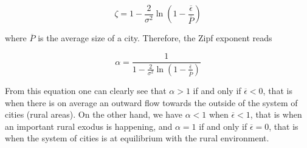 \begin{equation}
    \zeta = 1 - \frac{2}{\sigma^2} \ln\left(1 -
    \frac{\overline{\epsilon}}{\overline{P}}\right)
\end{equation}

where $\overline{P}$ is the average size of a city. Therefore, the Zipf exponent
reads

\begin{equation}
    \boxed{    \alpha = \frac{1}{1 - \frac{2}{\sigma^2} \ln\left(1 -
\frac{\overline{\epsilon}}{\overline{P}}\right)}}
\end{equation}

From this equation one can clearly see that $\alpha > 1$ if and only if
$\overline{\epsilon} < 0$, that is when there is on average an outward flow
towards the outside of the system of cities (rural areas). On the other hand, we
have $\alpha < 1$ when $\overline{\epsilon} < 1$, that is when an important
rural exodus is happening, and $\alpha = 1$ if and only if $\overline{\epsilon}
= 0$, that is when the system of cities is at equilibrium with the rural
environment.
